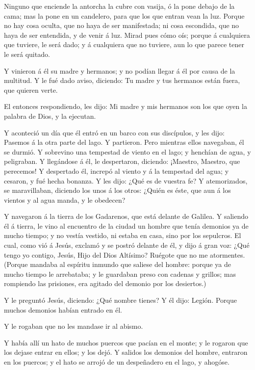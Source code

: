  Ninguno que enciende la antorcha la cubre con vasija, ó la
pone debajo de la cama; mas la pone en un candelero, para que los que
entran vean la luz.  Porque no hay cosa oculta, que no haya
de ser manifestada; ni cosa escondida, que no haya de ser entendida, y
de venir á luz.  Mirad pues cómo oís; porque á cualquiera
que tuviere, le será dado; y á cualquiera que no tuviere, aun lo que
parece tener le será quitado.

 Y vinieron á él su madre y hermanos; y no podían llegar á
él por causa de la multitud.  Y le fué dado aviso,
diciendo: Tu madre y tus hermanos están fuera, que quieren verte.

 El entonces respondiendo, les dijo: Mi madre y mis
hermanos son los que oyen la palabra de Dios, y la ejecutan.

 Y aconteció un día que él entró en un barco con sus
discípulos, y les dijo: Pasemos á la otra parte del lago. Y partieron.
 Pero mientras ellos navegaban, él se durmió. Y sobrevino
una tempestad de viento en el lago; y henchían de agua, y peligraban.
 Y llegándose á él, le despertaron, diciendo: ¡Maestro,
Maestro, que perecemos! Y despertado él, increpó al viento y á la
tempestad del agua; y cesaron, y fué hecha bonanza.  Y les
dijo: ¿Qué es de vuestra fe? Y atemorizados, se maravillaban, diciendo
los unos á los otros: ¿Quién es éste, que aun á los vientos y al agua
manda, y le obedecen?

 Y navegaron á la tierra de los Gadarenos, que está delante
de Galilea.  Y saliendo él á tierra, le vino al encuentro
de la ciudad un hombre que tenía demonios ya de mucho tiempo; y no
vestía vestido, ni estaba en casa, sino por los sepulcros. 
El cual, como vió á Jesús, exclamó y se postró delante de él, y dijo á
gran voz: ¿Qué tengo yo contigo, Jesús, Hijo del Dios Altísimo? Ruégote
que no me atormentes.  (Porque mandaba al espíritu inmundo
que saliese del hombre: porque ya de mucho tiempo le arrebataba; y le
guardaban preso con cadenas y grillos; mas rompiendo las prisiones, era
agitado del demonio por los desiertos.)

 Y le preguntó Jesús, diciendo: ¿Qué nombre tienes? Y él
dijo: Legión. Porque muchos demonios habían entrado en él.

 Y le rogaban que no les mandase ir al abismo.

 Y había allí un hato de muchos puercos que pacían en el
monte; y le rogaron que los dejase entrar en ellos; y los dejó.
 Y salidos los demonios del hombre, entraron en los
puercos; y el hato se arrojó de un despeñadero en el lago, y ahogóse.

